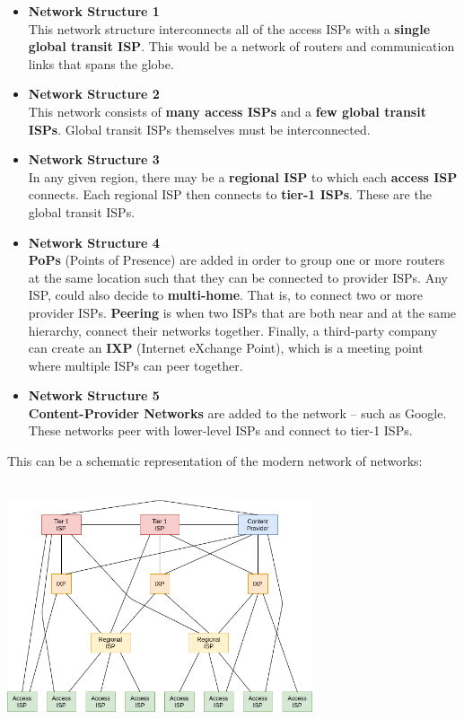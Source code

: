 \documentclass{article}
\begin{document}
\begin{itemize}
	\item \textbf{Network Structure 1}
	\vspace{.2cm} \\
	This network structure interconnects all of the access ISPs with a \textbf{single global transit ISP}. This would be a network of routers and communication links that spans the globe.
	
	\item \textbf{Network Structure 2}
	\vspace{.2cm} \\
	This network consists of \textbf{many access ISPs} and a \textbf{few global transit ISPs}. Global transit ISPs themselves must be interconnected.
	
	\item \textbf{Network Structure 3}
	\vspace{.2cm} \\
	In any given region, there may be a \textbf{regional ISP} to which each \textbf{access ISP} connects. Each regional ISP then connects to \textbf{tier-1 ISPs}. These are the global transit ISPs.
	
	\item \textbf{Network Structure 4}
	\vspace{.2cm} \\
	\textbf{PoPs} (Points of Presence) are added in order to group one or more routers at the same location such that they can be connected to provider ISPs. Any ISP, could also decide to \textbf{multi-home}. That is, to connect two or more provider ISPs. \textbf{Peering} is when two ISPs that are both near and at the same hierarchy, connect their networks together. Finally, a third-party company can create an \textbf{IXP} (Internet eXchange Point), which is a meeting point where multiple ISPs can peer together.
	
	\item \textbf{Network Structure 5}
	\vspace{.2cm} \\
	\textbf{Content-Provider Networks} are added to the network -- such as Google. These networks peer with lower-level ISPs and connect to tier-1 ISPs.
\end{itemize}
This can be a schematic representation of the modern network of networks: \\ \\
\centerline{\includegraphics[width=9cm]{./assets/n_of_ns.png}}
\end{document}
